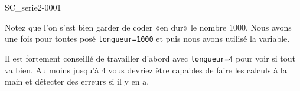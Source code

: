 \begin{corrige}{SC_serie2-0001}



Notez que l'on s'est bien garder de coder «en dur» le nombre $1000$. Nous avons une fois pour toutes posé \verb+longueur=1000+ et puis nous avons utilisé la variable.

Il est fortement conseillé de travailler d'abord avec \verb+longueur=4+ pour voir si tout va bien. Au moins jusqu'à $4$ vous devriez être capables de faire les calculs à la main et détecter des erreurs si il y en a.

\end{corrige}
